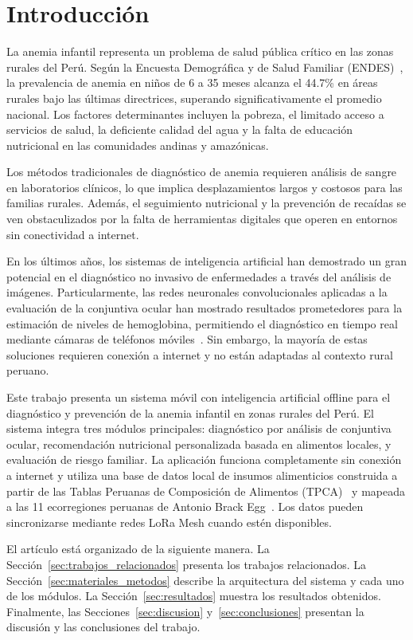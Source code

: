 \section{Introducción}
\label{sec:introduccion}

La anemia infantil representa un problema de salud pública crítico en las zonas rurales del Perú. Según la Encuesta Demográfica y de Salud Familiar (ENDES)~\cite{inei2023endes}, la prevalencia de anemia en niños de 6 a 35 meses alcanza el 44.7\% en áreas rurales bajo las últimas directrices, superando significativamente el promedio nacional. Los factores determinantes incluyen la pobreza, el limitado acceso a servicios de salud, la deficiente calidad del agua y la falta de educación nutricional en las comunidades andinas y amazónicas.

Los métodos tradicionales de diagnóstico de anemia requieren análisis de sangre en laboratorios clínicos, lo que implica desplazamientos largos y costosos para las familias rurales. Además, el seguimiento nutricional y la prevención de recaídas se ven obstaculizados por la falta de herramientas digitales que operen en entornos sin conectividad a internet.

En los últimos años, los sistemas de inteligencia artificial han demostrado un gran potencial en el diagnóstico no invasivo de enfermedades a través del análisis de imágenes. Particularmente, las redes neuronales convolucionales aplicadas a la evaluación de la conjuntiva ocular han mostrado resultados prometedores para la estimación de niveles de hemoglobina, permitiendo el diagnóstico en tiempo real mediante cámaras de teléfonos móviles~\cite{zhao2024prediction, uvadar2023NoninvasiveHE}. Sin embargo, la mayoría de estas soluciones requieren conexión a internet y no están adaptadas al contexto rural peruano.

Este trabajo presenta un sistema móvil con inteligencia artificial offline para el diagnóstico y prevención de la anemia infantil en zonas rurales del Perú. El sistema integra tres módulos principales: diagnóstico por análisis de conjuntiva ocular, recomendación nutricional personalizada basada en alimentos locales, y evaluación de riesgo familiar. La aplicación funciona completamente sin conexión a internet y utiliza una base de datos local de insumos alimenticios construida a partir de las Tablas Peruanas de Composición de Alimentos (TPCA)~\cite{INS2023} y mapeada a las 11 ecorregiones peruanas de Antonio Brack Egg~\cite{brack1986ecorregiones}. Los datos pueden sincronizarse mediante redes LoRa Mesh cuando estén disponibles.

El artículo está organizado de la siguiente manera. La Sección~\ref{sec:trabajos_relacionados} presenta los trabajos relacionados. La Sección~\ref{sec:materiales_metodos} describe la arquitectura del sistema y cada uno de los módulos. La Sección~\ref{sec:resultados} muestra los resultados obtenidos. Finalmente, las Secciones~\ref{sec:discusion} y~\ref{sec:conclusiones} presentan la discusión y las conclusiones del trabajo.

